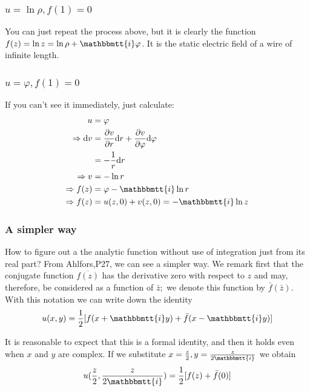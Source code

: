 \documentclass[]{ctexart}
\newcommand{\mi}{\mathbbmtt{i}}
\newcommand{\di}{\mathrm{d}}
\newcommand{\pa}{\partial}
\begin{document}
			\subsubsection{$u=\ln \rho, f(1)=0$}
				You can just repeat the process above, but it is clearly the function $f(z)=\ln z=\ln \rho +\mi \varphi$. It is the static electric field of a wire of infinite length. 
			
			\subsubsection{$u=\varphi, f(1)=0$}
				If you can't see it immediately, just calculate:
					\begin{equation*}
					\begin{aligned}
						u&=\varphi\\
						\Rightarrow \di v&=\frac{\pa v}{\pa r}\di r+\frac{\pa v}{\pa \varphi}\di \varphi\\
						&=-\frac{1}{r}\di r\\
						\Rightarrow v&=-\ln r\\
						\Rightarrow f(z)&=\varphi-\mi \ln r\\
						\Rightarrow f(z)&=u(z,0)+v(z,0)=-\mi \ln z
					\end{aligned}
					\end{equation*}
			
			\subsubsection{A simpler way}
				How to figure out a the analytic function without use of integration just from its real part? From Ahlfors,P27, we can see a simpler way. We remark first that the conjugate function $\overline{f(z)}$ has the derivative zero with respect to $z$ and may, therefore, be considered as a function of $\bar{z} ;$ we denote this function by $\bar{f}(\bar{z}) .$ With this notation we can write down the identity
					\begin{equation*}
						u(x, y)=\frac{1}{2}[f(x+\mi y)+\bar{f}(x-\mi y)]
					\end{equation*}
				
				It is reasonable to expect that this is a formal identity, and then it holds even when $x$ and $y$ are complex. If we substitute $x=\frac{z}{2}, y=\frac{z}{2\mi }$ we obtain
					\begin{equation*}
						u(\frac{z}{2},\frac{z}{2\mi})=\frac{1}{2}[f(z)+\bar{f}(0)]
					\end{equation*}
				
\end{document}
